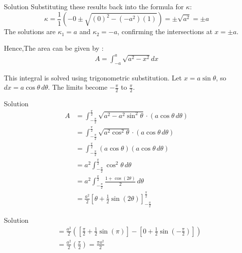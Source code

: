 \documentclass{beamer}
\begin{document}
\begin{frame}{Solution}
Substituting these results back into the formula for $\kappa$:
\[
\kappa = \frac{1}{1} \left( -0 \pm \sqrt{ (0)^2 - (-a^2)(1) } \right) = \pm \sqrt{a^2} = \pm a
\]
The solutions are $\kappa_1 = a$ and $\kappa_2 = -a$, confirming the intersections at $x=\pm a$.

Hence,The area can be given by :
\begin{align}
	A = \int_{-a}^{a} \sqrt{a^2 - x^2} dx
\end{align}


This integral is solved using trigonometric substitution. Let $x = a \sin\theta$, so $dx = a \cos\theta \,d\theta$. The limits become $-\frac{\pi}{2}$ to $\frac{\pi}{2}$.
\end{frame}
\begin{frame}{Solution}
\begin{align}
	A &= \int_{-\frac{\pi}{2}}^{\frac{\pi}{2}} \sqrt{a^2 - a^2\sin^2\theta} \cdot (a \cos\theta \,d\theta) \\
	&= \int_{-\frac{\pi}{2}}^{\frac{\pi}{2}} \sqrt{a^2\cos^2\theta} \cdot (a \cos\theta \,d\theta) \\
	&= \int_{-\frac{\pi}{2}}^{\frac{\pi}{2}} (a \cos\theta) (a \cos\theta \,d\theta) \\
	&= a^2 \int_{-\frac{\pi}{2}}^{\frac{\pi}{2}} \cos^2\theta \,d\theta \\
	&= a^2 \int_{-\frac{\pi}{2}}^{\frac{\pi}{2}} \frac{1 + \cos(2\theta)}{2} \,d\theta \\
	&= \frac{a^2}{2} \left[ \theta + \frac{1}{2}\sin(2\theta) \right]_{-\frac{\pi}{2}}^{\frac{\pi}{2}} 
\end{align}
\end{frame}

\begin{frame}{Solution}
\begin{align}
	&= \frac{a^2}{2} \left( \left[ \frac{\pi}{2} + \frac{1}{2}\sin(\pi) \right] - \left[ 0 + \frac{1}{2}\sin(-\frac{\pi}{2}) \right] \right) \\
&= \frac{a^2}{2} \left( \frac{\pi}{2} \right) = \frac{\pi a^2}{2}
\end{align}
\end{frame}
\end{document}
